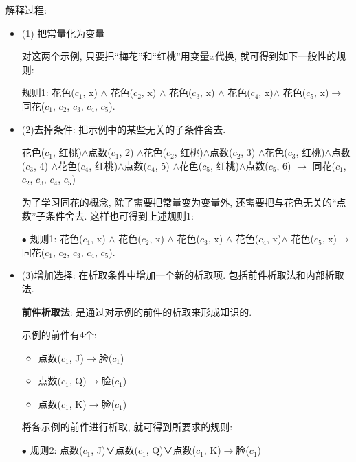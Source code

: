 解释过程:
\begin{itemize}
\item (1) 把常量化为变量
\begin{example}
对这两个示例, 只要把“梅花”和“红桃”用变量$x$代换, 就可得到如下一般性的规则:

    规则1: 花色($c_1$, x) $\wedge$ 花色($c_2$, x) $\wedge$ 花色($c_3$, x) $\wedge$ 花色($c_4$, x)$\wedge$ 花色($c_5$, x)$\rightarrow$ 同花($c_1$, $c_2$, $c_3$, $c_4$, $c_5$).
\end{example}

\item (2)去掉条件: 把示例中的某些无关的子条件舍去.

\begin{example}
  花色($c_1$, 红桃)$\wedge$点数($c_1$, 2)
            $\wedge$花色($c_2$, 红桃)$\wedge$点数($c_2$, 3)
            $\wedge$花色($c_3$, 红桃)$\wedge$点数($c_3$, 4)
            $\wedge$花色($c_4$, 红桃)$\wedge$点数($c_4$, 5)
            $\wedge$花色($c_5$, 红桃)$\wedge$点数($c_5$, 6)
          $\rightarrow$ 同花($c_1$, $c_2$, $c_3$, $c_4$, $c_5$)
\end{example}

为了学习同花的概念, 除了需要把常量变为变量外, 还需要把与花色无关的“点数”子条件舍去. 这样也可得到上述规则1:

$\bullet$ 规则1: 花色($c_1$, x) $\wedge$ 花色($c_2$, x) $\wedge$ 花色($c_3$, x) $\wedge$ 花色($c_4$, x)$\wedge$ 花色($c_5$, x)$\rightarrow$ 同花($c_1$, $c_2$, $c_3$, $c_4$, $c_5$).

\item (3)增加选择: 在析取条件中增加一个新的析取项. 包括前件析取法和内部析取法.

\textbf{前件析取法}: 是通过对示例的前件的析取来形成知识的.

\begin{example}示例的前件有4个:
\begin{itemize}
\item 点数($c_1$, J)$\rightarrow$脸($c_1$)
\item 点数($c_1$, Q)$\rightarrow$脸($c_1$)
\item 点数($c_1$, K)$\rightarrow$脸($c_1$)
\end{itemize}

将各示例的前件进行析取, 就可得到所要求的规则:

 $\bullet$ 规则2: 点数($c_1$, J)∨点数($c_1$, Q)∨点数($c_1$, K)$\rightarrow$脸($c_1$)
\end{example}


\end{itemize}
